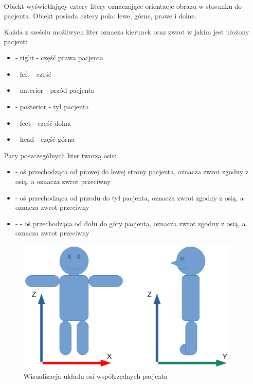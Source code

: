 \subsubsection{}

Obiekt wyświetlający cztery litery oznaczające orientacje obrazu w stosunku do pacjenta.
Obiekt posiada cztery pola: lewe, górne, prawe i dolne.

Każda z sześciu możliwych liter oznacza kierunek oraz zwrot w jakim jest ułożony pacjent:
\begin{itemize}
    \item {} - right - część prawa pacjenta
    \item {} - left - część
    \item {} - anterior - przód pacjenta
    \item {} - posterior - tył pacjenta
    \item {} - feet - część dolna
    \item {} - head - część górna
\end{itemize}

Pary poszczególnych liter tworzą osie:
\begin{itemize}
    \item {} - oś przechodząca od prawej do lewej strony pacjenta,  oznacza zwrot zgodny z osią, a  oznacza zwrot przeciwny

    \item {} - oś przechodząca od przodu do tył pacjenta,  oznacza zwrot zgodny z osią, a  oznacza zwrot przeciwny

    \item {} -  - oś przechodząca od dołu do góry pacjenta,  oznacza zwrot zgodny z osią, a  oznacza zwrot przeciwny

\end{itemize}

\begin{figure}[!htbp]
    \centering
    \includegraphics[width=\textwidth]{img/imageorientationindicator-003.pdf}
    \caption{Wizualizacja układu osi współrzędnych pacjenta}
    \label{fig:imageorientationindicator2}
\end{figure}

